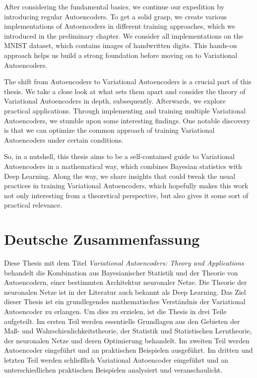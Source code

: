 \documentclass[11pt, twoside, a4paper]{book}
\theoremstyle{plain}
\theoremstyle{definition}
\theoremstyle{plain}
\begin{document}
After considering the fundamental basics, we continue our expedition by introducing regular Autoencoders. To get a solid grasp, we create various implementations of Autoencoders in different training approaches, which we introduced in the preliminary chapter. We consider all implementations on the MNIST dataset, which contains images of handwritten digits. This hands-on approach helps us build a strong foundation before moving on to Variational Autoencoders.

The shift from Autoencoders to Variational Autoencoders is a crucial part of this thesis. We take a close look at what sets them apart and consider the theory of Variational Autoencoders in depth, subsequently. Afterwards, we explore practical applications. Through implementing and training multiple Variational Autoencoders, we stumble upon some interesting findings. One notable discovery is that we can optimize the common approach of training Variational Autoencoders under certain conditions.

So, in a nutshell, this thesis aims to be a self-contained guide to Variational Autoencoders in a mathematical way, which combines Bayesian statistics with Deep Learning. Along the way, we share insights that could tweak the usual practices in training Variational Autoencoders, which hopefully makes this work not only interesting from a theoretical perspective, but also gives it some sort of practical relevance.








\newpage
{}

\section*{Deutsche Zusammenfassung}

Diese Thesis mit dem Titel \textit{Variational Autoencoders: Theory and Applications} behandelt die Kombination aus Bayesianischer Statistik und der Theorie von Autoencodern, einer bestimmten Architektur neuronaler Netze. Die Theorie der neuronalen Netze ist in der Literatur auch bekannt als \glqq Deep Learning\grqq{}. Das Ziel dieser Thesis ist ein grundlegendes mathematisches Verständnis der Variational Autoencoder zu erlangen. Um dies zu erzielen, ist die Thesis in drei Teile aufgeteilt. Im ersten Teil werden essentielle Grundlagen aus den Gebieten der Maß- und Wahrschienlichkeitstheorie, der Statistik und Statistischen Lerntheorie, der neuronalen Netze und deren Optimierung behandelt. Im zweiten Teil werden Autoencoder eingeführt und an praktischen Beispielen ausgeführt. Im dritten und letzten Teil werden schließlich Variational Autoencoder eingeführt und an unterschiedlichen praktischen Beispielen analysiert und veranschaulicht.
\end{document}
